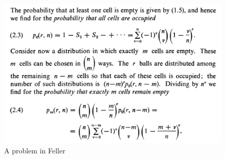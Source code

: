 \begin{figure}[h]
    \centering
    \includegraphics[width=\textwidth]{Figures/rc1_f2.png}
    \caption{A problem in Feller}
    \label{fig:rc1_2}
\end{figure}
